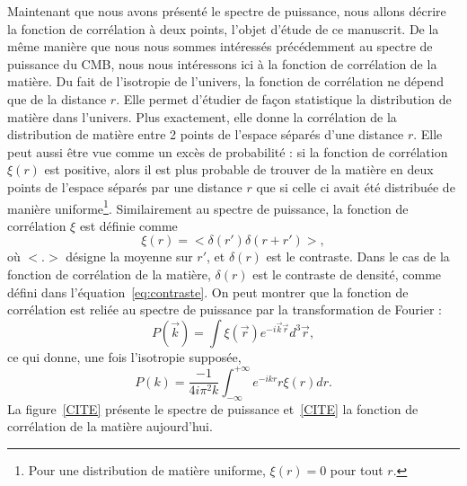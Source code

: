\documentclass[11pt, twoside, a4paper, openright]{report}
\begin{document}
Maintenant que nous avons présenté le spectre de puissance, nous allons décrire la fonction de corrélation à deux points, l'objet d'étude de ce manuscrit. De la même manière que nous nous sommes intéressés précédemment au spectre de puissance du CMB, nous nous intéressons ici à la fonction de corrélation de la matière. Du fait de l'isotropie de l'univers, la fonction de corrélation ne dépend que de la distance $r$. Elle permet d'étudier de façon statistique la distribution de matière dans l'univers. Plus exactement, elle donne la corrélation de la distribution de matière entre 2 points de l'espace séparés d'une distance $r$. Elle peut aussi être vue comme un excès de probabilité : si la fonction de corrélation $\xi(r)$ est positive, alors il est plus probable de trouver de la matière en deux points de l'espace séparés par une distance $r$ que si celle ci avait été distribuée de manière uniforme\footnote{Pour une distribution de matière uniforme, $\xi(r) = 0$ pour tout $r$.}. Similairement au spectre de puissance, la fonction de corrélation $\xi$ est définie comme
\begin{equation}
  \label{eq:def_cf}
  \xi(r) = < \delta(r') \delta(r + r') >,
\end{equation}
où $<.>$ désigne la moyenne sur $r'$, et $\delta(r)$ est le contraste. Dans le cas de la fonction de corrélation de la matière, $\delta(r)$ est le contraste de densité, comme défini dans l'équation~\ref{eq:contraste}.
On peut montrer que la fonction de corrélation est reliée au spectre de puissance par la transformation de Fourier :
\begin{equation}
  \label{eq:cf_tf}
  P(\vec{k}) = \int \xi(\vec{r}) e^{- i \vec{k} \vec{r}} d^3\vec{r} ,
\end{equation}
ce qui donne, une fois l'isotropie supposée,
\begin{equation}
  \label{eq:cf_tf2}
  P(k) = \frac{-1}{4 i \pi^2 k} \int_{-\infty}^{+\infty} e^{- i k r} r \xi(r) dr .
\end{equation}
La figure~\ref{CITE} présente le spectre de puissance et~\ref{CITE} la fonction de corrélation de la matière aujourd'hui.




\end{document}
